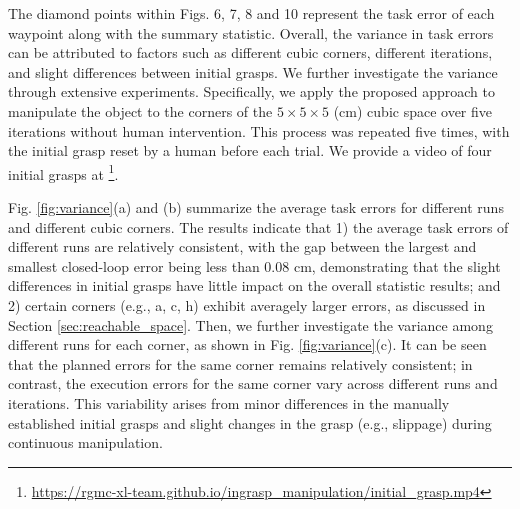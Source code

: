 {\begin{figure*} [tb]
  \centering 
  \caption{Variance of task errors. (a) Variance w.r.t. different runs, where each bar represents the average error over 40 waypoints (five iterations of eight corners) in each run. (b) Variance w.r.t. different cubic corners, where each bar represents the average error over 25 attempts (five iterations in five runs) at each corner. (c) Variance w.r.t. different runs for each corner, where each bar represents the average error over five iterations for each corner in each run. The error bars represent the standard deviation.
  }
  \label{fig:variance}
\end{figure*}

The diamond points within Figs. 6, 7, 8 and 10 represent the task error of each waypoint along with the summary statistic. 
Overall, the variance in task errors can be attributed to factors such as different cubic corners, different iterations, and slight differences between initial grasps.
We further investigate the variance through extensive experiments. 
Specifically, we apply the proposed approach to manipulate the object to the corners of the $5 \times 5 \times 5$ (cm) cubic space over five iterations without human intervention. This process was repeated five times, with the initial grasp reset by a human before each trial. 
We provide a video of four initial grasps at \href{https://rgmc-xl-team.github.io/ingrasp_manipulation/initial_grasp.mp4}{}\footnote{
\href{https://rgmc-xl-team.github.io/ingrasp_manipulation/initial_grasp.mp4}{https://rgmc-xl-team.github.io/ingrasp\_manipulation/initial\_grasp.mp4}
}.

Fig. \ref{fig:variance}(a) and (b) summarize the average task errors for different runs and different cubic corners. The results indicate that 
1) the average task errors of different runs are relatively consistent, with the gap between the largest and smallest closed-loop error being less than 0.08 cm, demonstrating that the slight differences in initial grasps have little impact on the overall statistic results;
and 2) certain corners (e.g., a, c, h) exhibit averagely larger errors, as discussed in Section \ref{sec:reachable_space}. 
Then, we further investigate the variance among different runs for each corner, as shown in Fig. \ref{fig:variance}(c). It can be seen that the planned errors for the same corner remains relatively consistent; in contrast, the execution errors for the same corner vary across different runs and iterations. This variability arises from minor differences in the manually established initial grasps and slight changes in the grasp (e.g., slippage) during continuous manipulation.


}
